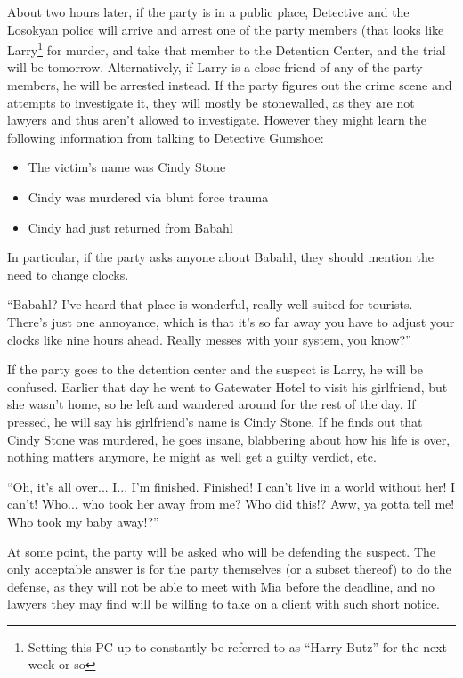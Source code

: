 About two hours later, if the party is in a public place, Detective  and the Losokyan police will arrive and arrest one of the party members (that looks like Larry\footnote{Setting this PC up to constantly be referred to as ``Harry Butz'' for the next week or so} for murder, and take that member to the Detention Center, and the trial will be tomorrow. Alternatively, if Larry is a close friend of any of the party members, he will be arrested instead. If the party figures out the crime scene and attempts to investigate it, they will mostly be stonewalled, as they are not lawyers and thus aren't allowed to investigate. However they might learn the following information from talking to Detective Gumshoe:
\begin{itemize}
\item The victim's name was Cindy Stone
\item Cindy was murdered via blunt force trauma
\item Cindy had just returned from Babahl
\end{itemize}
In particular, if the party asks anyone about Babahl, they should mention the need to change clocks.
\begin{center}
``Babahl? I've heard that place is wonderful, really well suited for tourists. There's just one annoyance, which is that it's so far away you have to adjust your clocks like nine hours ahead. Really messes with your system, you know?''
\end{center}

If the party goes to the detention center and the suspect is Larry, he will be confused. Earlier that day he went to Gatewater Hotel to visit his girlfriend, but she wasn't home, so he left and wandered around for the rest of the day. If pressed, he will say his girlfriend's name is Cindy Stone. If he finds out that Cindy Stone was murdered, he goes insane, blabbering about how his life is over, nothing matters anymore, he might as well get a guilty verdict, etc. 

\begin{center}
``Oh, it's all over... I... I'm finished. Finished! I can't live in a world without her! I can't! Who... who took her away from me? Who did this!? Aww, ya gotta tell me! Who took my baby away!?''
\end{center}

At some point, the party will be asked who will be defending the suspect. The only acceptable answer is for the party themselves (or a subset thereof) to do the defense, as they will not be able to meet with Mia before the deadline, and no lawyers they may find will be willing to take on a client with such short notice.

